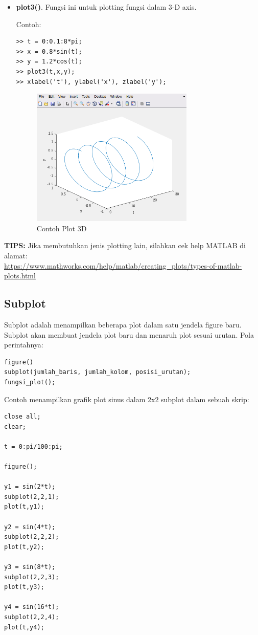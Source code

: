 \documentclass[12pt]{book}
\begin{document}
\begin{itemize}
		\item \textbf{plot3()}. Fungsi ini untuk plotting fungsi dalam 3-D axis.

		Contoh:
		\begin{verbatim}
>> t = 0:0.1:8*pi;
>> x = 0.8*sin(t);
>> y = 1.2*cos(t);
>> plot3(t,x,y);
>> xlabel('t'), ylabel('x'), zlabel('y');
		\end{verbatim}

		\newpage
		\begin{figure}[!ht]
			\centering
			\includegraphics[width=220pt]{images/plot3d}
			\caption{Contoh Plot 3D}
		\end{figure}
	\end{itemize}

	\textbf{TIPS:} Jika membutuhkan jenis plotting lain, silahkan cek help MATLAB di alamat:\\
	\url{https://www.mathworks.com/help/matlab/creating_plots/types-of-matlab-plots.html}

	\subsection{Subplot}

	Subplot adalah menampilkan beberapa plot dalam satu jendela figure baru.
	Subplot akan membuat jendela plot baru dan menaruh plot sesuai urutan.
	Pola perintahnya:
	\begin{verbatim}
figure()
subplot(jumlah_baris, jumlah_kolom, posisi_urutan);
fungsi_plot();
	\end{verbatim}

	Contoh menampilkan grafik plot sinus dalam 2x2 subplot dalam sebuah skrip:
	\begin{verbatim}
close all;
clear;

t = 0:pi/100:pi;

figure();

y1 = sin(2*t);
subplot(2,2,1);
plot(t,y1);

y2 = sin(4*t);
subplot(2,2,2);
plot(t,y2);

y3 = sin(8*t);
subplot(2,2,3);
plot(t,y3);

y4 = sin(16*t);
subplot(2,2,4);
plot(t,y4);
	\end{verbatim}
\end{document}
